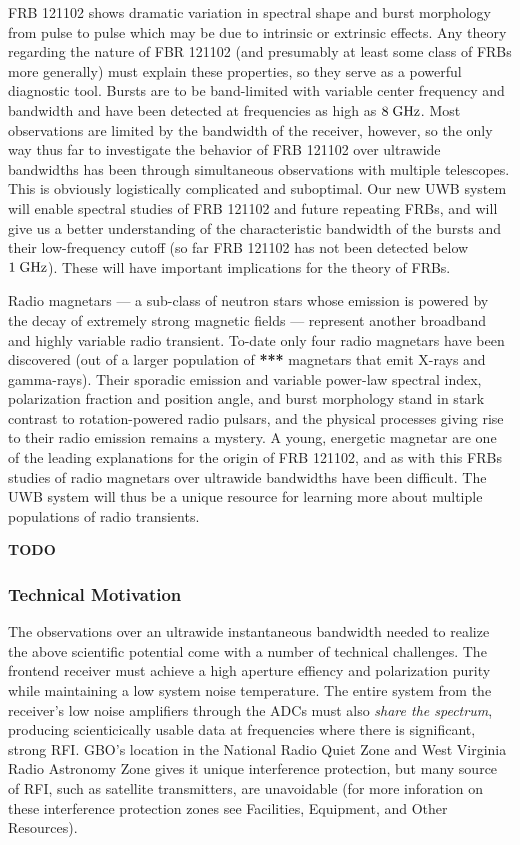 \documentclass[10pt]{NSF}
\begin{document}
FRB 121102 shows dramatic variation in spectral shape and burst
morphology from pulse to pulse which may be due to intrinsic or
extrinsic effects.  Any theory regarding the nature of FBR 121102 (and
presumably at least some class of FRBs more generally) must explain
these properties, so they serve as a powerful diagnostic tool.  Bursts
are to be band-limited with variable center frequency and bandwidth
and have been detected at frequencies as high as $8\; \textrm{GHz}$.  Most
observations are limited by the bandwidth of the receiver, however, so
the only way thus far to investigate the behavior of FRB 121102 over
ultrawide bandwidths has been through simultaneous observations with
multiple telescopes.  This is obviously logistically complicated and
suboptimal.  Our new UWB system will enable spectral studies of FRB
121102 and future repeating FRBs, and will give us a better
understanding of the characteristic bandwidth of the bursts and their
low-frequency cutoff (so far FRB 121102 has not been detected below
$1\; \textrm{GHz}$).  These will have important implications for the theory of
FRBs.

Radio magnetars --- a sub-class of neutron stars whose emission is
powered by the decay of extremely strong magnetic fields --- represent
another broadband and highly variable radio transient.  To-date only
four radio magnetars have been discovered (out of a larger population
of \textbf{***} magnetars that emit X-rays and gamma-rays).  Their
sporadic emission and variable power-law spectral index, polarization
fraction and position angle, and burst morphology stand in stark
contrast to rotation-powered radio pulsars, and the physical processes
giving rise to their radio emission remains a mystery.  A young,
energetic magnetar are one of the leading explanations for the origin
of FRB 121102, and as with this FRBs studies of radio magnetars over
ultrawide bandwidths have been difficult.  The UWB system will thus be
a unique resource for learning more about multiple populations of
radio transients.

 \textbf{TODO}

\subsubsection{Technical Motivation}
\label{sec:technical_motivation}

The observations over an ultrawide instantaneous bandwidth needed to
realize the above scientific potential come with a number of technical
challenges.  The frontend receiver must achieve a high aperture
effiency and polarization purity while maintaining a low system noise
temperature.  The entire system from the receiver's low noise
amplifiers through the ADCs must also \emph{share the spectrum},
producing scienticically usable data at frequencies where there is
significant, strong RFI.  GBO's location in the National Radio Quiet
Zone and West Virginia Radio Astronomy Zone gives it unique
interference protection, but many source of RFI, such as satellite
transmitters, are unavoidable (for more inforation on these
interference protection zones see Facilities, Equipment, and Other
Resources).
\end{document}
